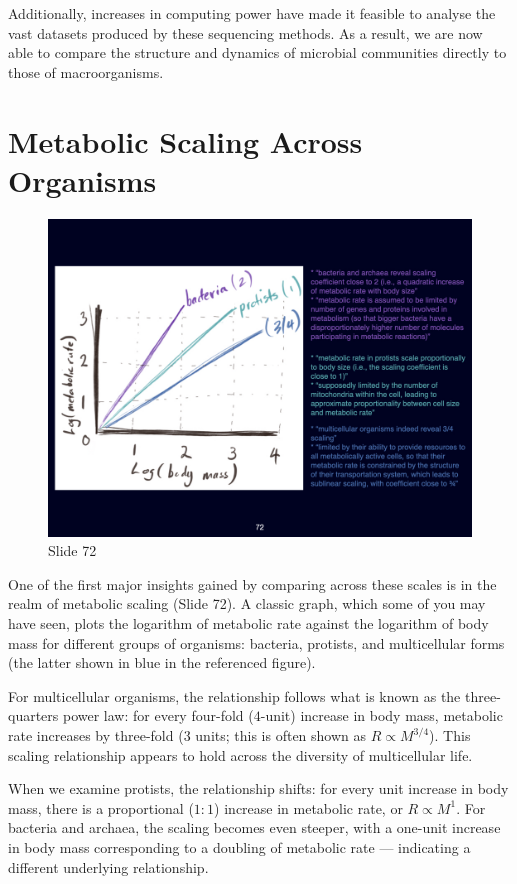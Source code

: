 \documentclass[
  11pt,
]{book}
\begin{document}
Additionally, increases in computing power have made it feasible to
analyse the vast datasets produced by these sequencing methods. As a
result, we are now able to compare the structure and dynamics of
microbial communities directly to those of macroorganisms.

\section{Metabolic Scaling Across
Organisms}\label{metabolic-scaling-across-organisms}

\begin{figure}[ht]
\centering
\includegraphics[width=0.8\linewidth]{../images/BDC334/BDC334-072.jpeg}
\caption*{Slide 72}
\end{figure}

One of the first major insights gained by comparing across these scales
is in the realm of metabolic scaling (Slide 72). A classic graph, which
some of you may have seen, plots the logarithm of metabolic rate against
the logarithm of body mass for different groups of organisms: bacteria,
protists, and multicellular forms (the latter shown in blue in the
referenced figure).

For multicellular organisms, the relationship follows what is known as
the three-quarters power law: for every four-fold (\(4\)-unit) increase
in body mass, metabolic rate increases by three-fold (\(3\) units; this
is often shown as \(R \propto M^{3/4}\)). This scaling relationship
appears to hold across the diversity of multicellular life.

When we examine protists, the relationship shifts: for every unit
increase in body mass, there is a proportional (\(1:1\)) increase in
metabolic rate, or \(R \propto M^1\). For bacteria and archaea, the
scaling becomes even steeper, with a one-unit increase in body mass
corresponding to a doubling of metabolic rate --- indicating a different
underlying relationship.
\end{document}
